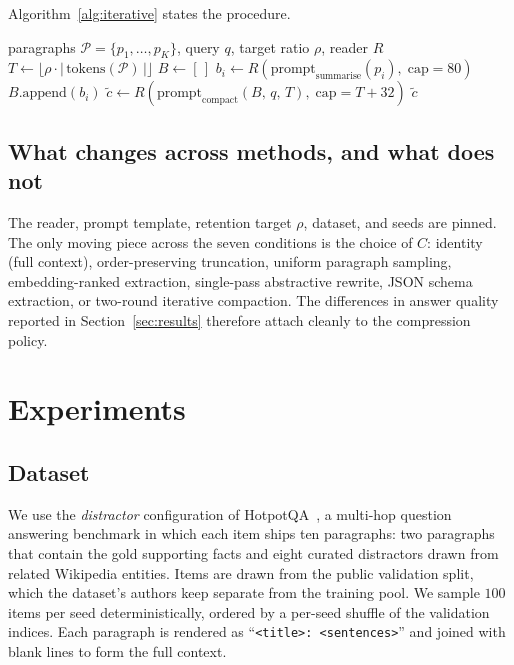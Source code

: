 \documentclass[10pt,twocolumn]{article}
\begin{document}
Algorithm~\ref{alg:iterative} states the procedure.

\begin{algorithm}[t]
\caption{Iterative two-round compaction.}
\label{alg:iterative}
\begin{algorithmic}[1]
\Require paragraphs $\mathcal{P} = \{p_1, \dots, p_K\}$, query $q$, target ratio $\rho$, reader $R$
\State $T \gets \lfloor \rho \cdot |\,\text{tokens}(\mathcal{P})\,| \rfloor$ 
\State $B \gets [\,]$ 
 
  \State $b_i \gets R(\text{prompt}_{\text{summarise}}(p_i),\; \text{cap}=80)$
  \State $B.\text{append}(b_i)$
\EndFor
\State $\tilde{c} \gets R(\text{prompt}_{\text{compact}}(B,\, q,\, T),\; \text{cap}=T+32)$ 
\State \Return $\tilde{c}$
\end{algorithmic}
\end{algorithm}

\subsection{What changes across methods, and what does not}

The reader, prompt template, retention target $\rho$, dataset, and seeds are pinned. The only moving piece across the seven conditions is the choice of $C$: identity (full context), order-preserving truncation, uniform paragraph sampling, embedding-ranked extraction, single-pass abstractive rewrite, JSON schema extraction, or two-round iterative compaction. The differences in answer quality reported in Section~\ref{sec:results} therefore attach cleanly to the compression policy.

\section{Experiments}
\label{sec:experiments}

\subsection{Dataset}
We use the \emph{distractor} configuration of HotpotQA~\cite{yang2018hotpotqa}, a multi-hop question answering benchmark in which each item ships ten paragraphs: two paragraphs that contain the gold supporting facts and eight curated distractors drawn from related Wikipedia entities. Items are drawn from the public validation split, which the dataset's authors keep separate from the training pool. We sample $100$ items per seed deterministically, ordered by a per-seed shuffle of the validation indices. Each paragraph is rendered as ``\texttt{<title>: <sentences>}'' and joined with blank lines to form the full context.
\end{document}
